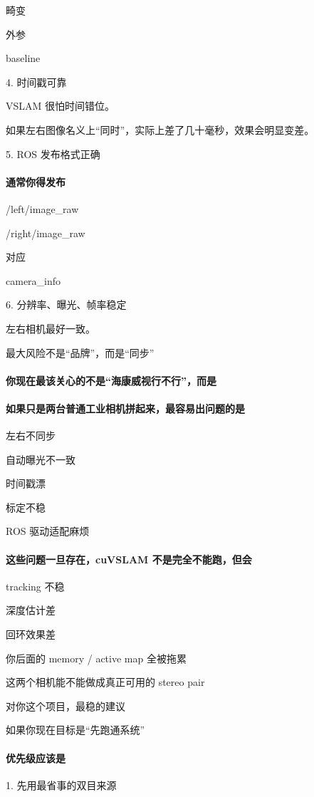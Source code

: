 \documentclass[12pt]{article}
\begin{document}
畸变

外参

baseline

4. 时间戳可靠

VSLAM 很怕时间错位。

如果左右图像名义上“同时”，实际上差了几十毫秒，效果会明显变差。

5. ROS 发布格式正确

\paragraph{通常你得发布}
/left/image\_raw

/right/image\_raw

对应

camera\_info

6. 分辨率、曝光、帧率稳定

左右相机最好一致。

最大风险不是“品牌”，而是“同步”

\paragraph{你现在最该关心的不是“海康威视行不行”，而是}
\paragraph{如果只是两台普通工业相机拼起来，最容易出问题的是}
左右不同步

自动曝光不一致

时间戳漂

标定不稳

ROS 驱动适配麻烦

\paragraph{这些问题一旦存在，cuVSLAM 不是完全不能跑，但会}
tracking 不稳

深度估计差

回环效果差

你后面的 memory / active map 全被拖累

这两个相机能不能做成真正可用的 stereo pair

对你这个项目，最稳的建议

如果你现在目标是“先跑通系统”

\paragraph{优先级应该是}
1. 先用最省事的双目来源
\end{document}
